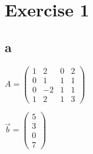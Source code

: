\documentclass{article}
\begin{document}
\section{Exercise 1}

\subsection{a}
$A=
\left (
    \begin{matrix}
        1 & 2 & 0 & 2\\
        0 & 1 & 1 & 1\\
        0 & -2 & 1 & 1\\
        1 & 2 & 1 & 3
    \end{matrix}
\right )
$

$\vec{b}=
\left (
    \begin{matrix}
        5\\
        3\\
        0\\
        7
    \end{matrix}
\right )
$
\end{document}
